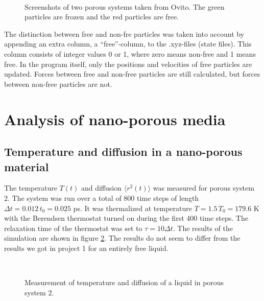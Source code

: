 \documentclass[12pt]{article}
\begin{document}
\begin{figure}[!ht]
    \begin{center}
        \hspace{5mm}
        \\ 
    \end{center}
    \caption{Screenshots of two porous systems taken from Ovito. The green particles are frozen and the red particles are free.}
    \label{fig:screenshots}
\end{figure}

The distinction between free and non-fre particles was taken into account by appending an extra column, a ``free''-column, to the .xyz-files (state files). This column consists of integer values
0 or 1, where zero means non-free and 1 means free. In the program itself, only the positions and velocities of free particles are updated. Forces between free and non-free particles are still calculated,
but forces between non-free particles are not.



\section{Analysis of nano-porous media}

\subsection{Temperature and diffusion in a nano-porous material}
The temperature $T(t)$ and diffusion $\langle r^2(t)\rangle$ was measured for porous system 2. The system was run over a total of 800 time steps of
length $\Delta t = 0.012\,t_0 = 0.025$ ps. It was thermalized at temperature $T=1.5\,T_0 = 179.6$ K with the Berendsen thermostat turned on during the first 400 time steps. The relaxation time of the thermostat
was set to $\tau = 10\Delta t$. The results of the simulation are shown in figure \ref{fig:nanoballs}. The results do not seem to differ from the results we got in project 1 for an entirely free liquid.

\begin{figure}[!ht]
    \begin{center}
        \hspace{5mm}
        \\ 
    \end{center}
    \caption{Measurement of temperature and diffusion of a liquid in porous system 2.}
    \label{fig:nanoballs}
\end{figure}
\end{document}
